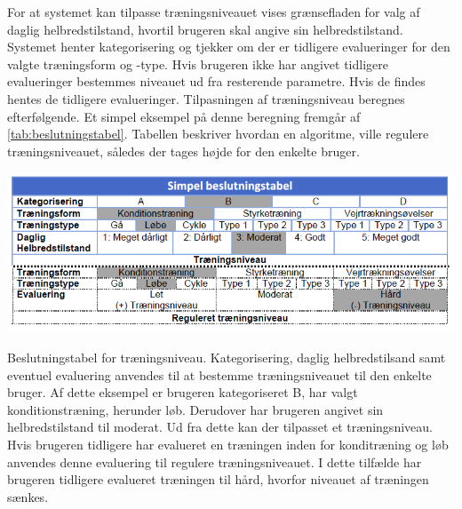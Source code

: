 \noindent
For at systemet kan tilpasse træningsniveauet vises grænsefladen for valg af daglig helbredstilstand, hvortil brugeren skal angive sin helbredstilstand. Systemet henter kategorisering og tjekker om der er tidligere evalueringer for den valgte træningsform og -type. Hvis brugeren ikke har angivet tidligere evalueringer bestemmes niveauet ud fra resterende parametre. Hvis de findes hentes de tidligere evalueringer. Tilpasningen af træningsniveau beregnes efterfølgende. Et simpel eksempel på denne beregning fremgår af \autoref{tab:beslutningstabel}. Tabellen beskriver hvordan en algoritme, ville regulere træningsniveauet, således der tages højde for den enkelte bruger.

\begin{table}[H]
\centering
\includegraphics[width=1\textwidth]{figures/aktivitetsdiagram/beslutningstabel}
\caption{Beslutningstabel for træningsniveau. Kategorisering, daglig helbredstilsand samt eventuel evaluering anvendes til at bestemme træningsniveauet til den enkelte bruger. Af dette eksempel er brugeren kategoriseret B, har valgt konditionstræning, herunder løb. Derudover har brugeren angivet sin helbredstilstand til moderat. Ud fra dette kan der tilpasset et træningsniveau. Hvis brugeren tidligere har evalueret en træningen inden for konditræning og løb anvendes denne evaluering til regulere træningsniveauet. I dette tilfælde har brugeren tidligere evalueret træningen til hård, hvorfor niveauet af træningen sænkes.}
\label{tab:beslutningstabel}
\end{table} 

